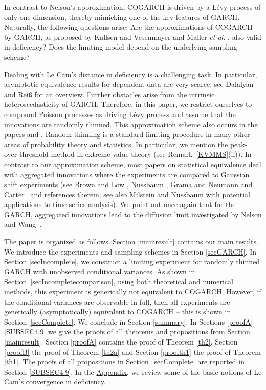 \documentclass[number,citesort,seceqn,dvips]{arxbj}
\begin{document}
In contrast to Nelson's approximation, COGARCH is driven by a L\'{e}vy
process of only one dimension, thereby mimicking one of the key
features of GARCH. Naturally, the following questions arise: Are the
approximations of COGARCH by GARCH, as proposed by Kallsen and
Vesenmayer \cite{KV07} and Maller \textit{et al.} \cite{MMS08}, also valid in
deficiency? Does the limiting model depend on the underlying sampling
scheme?

Dealing with Le Cam's distance in deficiency is a challenging task. In
particular, asymptotic equivalence results for dependent data are very
scarce; see Dalalyan and Rei{\ss} \cite{DR06} for an overview. Further
obstacles arise from the intrinsic heteroscedasticity of GARCH.
Therefore, in this paper, we restrict ourselves to compound Poisson
processes as driving L\'{e}vy process and assume that the innovations
are randomly thinned. This approximation scheme also occurs in the
papers \cite{KV07} and \cite{MMS08}. Random thinning is a standard
limiting procedure in many other areas of probability theory and
statistics. In particular, we mention the peak-over-threshold method in
extreme value theory (see Remark~\ref{KVMMS}(ii)). In contrast to our
approximation scheme, most papers on statistical equivalence deal with
aggregated innovations where the experiments are compared to Gaussian
shift experiments (see Brown and Low \cite{BL96},
Nussbaum \cite{Nu96}, Grama and Neumann \cite{GN06} and
Carter~\cite{C07} and references therein; see also Milstein and
Nussbaum \cite{MN98} with potential applications to time series
analysis). We point out once again that for the GARCH, aggregated
innovations lead to the diffusion limit investigated by
Nelson \cite{Ne90} and Wang~\cite{Wa02}.

The paper is organized as follows. Section \ref{mainresult} contains
our main results. We introduce the experiments and sampling schemes in
Section \ref{secGARCH}. In Section \ref{secIncomplete}, we construct a
limiting experiment for randomly thinned GARCH with unobserved conditional
variances. As shown in
Section~\ref{secIncompletecomparison}, using both theoretical and
numerical methods, this experiment is generically not equivalent to
COGARCH. However, if the conditional variances are observable in full,
then all experiments are generically (asymptotically) equivalent to
COGARCH -- this is shown in Section~\ref{secComplete}. We conclude in
Section \ref{summary}. In Sections \ref{proofA}--\ref{SUBSEC4.9} we
give the proofs of all theorems and propositions from
Section \ref{mainresult}. Section \ref{proofA} contains the proof of
Theorem \ref{th2}, Section \ref{proofB} the proof of Theorem \ref{th2a}
and Section \ref{proofth1} the proof of Theorem \ref{th1}. The proofs
of all propositions in Section~\ref{secComplete} are reported in
Section \ref{SUBSEC4.9}. In the \hyperref[appendix]{Appendix}, we review some of the basic
notions of Le Cam's convergence in deficiency.
\end{document}
